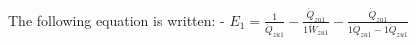 The following equation is written:  
- \( E_1 = \frac{1}{\dot{Q}_{zu1}} - \frac{\dot{Q}_{zu1}}{1 \dot{W}_{zu1}} - \frac{\dot{Q}_{zu1}}{1 \dot{Q}_{zu1} - 1 \dot{Q}_{zu1}} \)